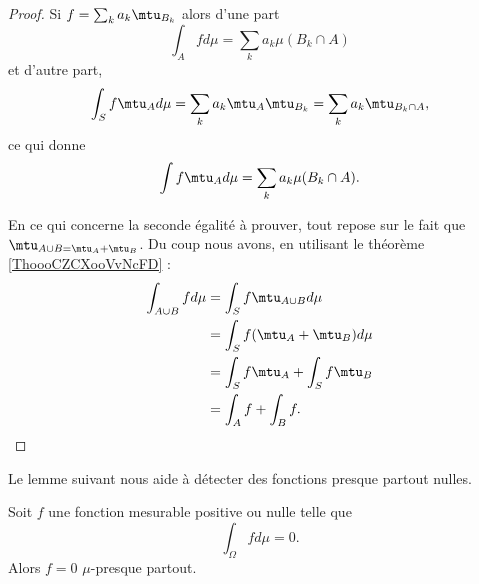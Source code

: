 \begin{proof}
    Si \( f=\sum_ka_k\mtu_{B_k}\) alors d'une part
    \begin{equation}
        \int_Afd\mu=\sum_ka_k\mu(B_k\cap A)
    \end{equation}
    et d'autre part,
    \begin{equation}
        \int_Sf\mtu_Ad\mu =\sum_ka_k\mtu_A\mtu_{B_k}=\sum_ka_k\mtu_{B_k\cap A},
    \end{equation}
    ce qui donne
    \begin{equation}
        \int f\mtu_Ad\mu=\sum_ka_k\mu(B_k\cap A).
    \end{equation}

    En ce qui concerne la seconde égalité à prouver, tout repose sur le fait que \( \mtu_{A\cup B=\mtu_A+\mtu_B}\). Du coup nous avons, en utilisant le théorème \ref{ThoooCZCXooVvNcFD} :
    \begin{subequations}
        \begin{align}
            \int_{A\cup B}fd\mu&=\int_Sf\mtu_{A\cup B}d\mu\\
            &=\int_Sf(\mtu_A+\mtu_B)d\mu\\
            &=\int_Sf\mtu_A+\int_Sf\mtu_B\\
            &=\int_Af+\int_Bf.
        \end{align}
    \end{subequations}
\end{proof}

Le lemme suivant nous aide à détecter des fonctions presque partout nulles.
\begin{lemma}   \label{Lemfobnwt}
    Soit \( f\) une fonction mesurable positive ou nulle telle que
    \begin{equation}
        \int_{\Omega}fd\mu=0.
    \end{equation}
    Alors \( f=0\) \( \mu\)-presque partout.
\end{lemma}

